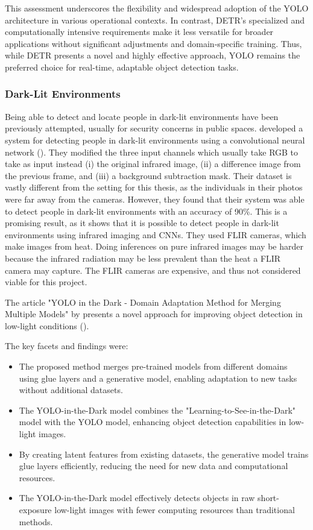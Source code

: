 This assessment underscores the flexibility and widespread adoption of the YOLO architecture in various operational contexts. In contrast, DETR's specialized and computationally intensive requirements make it less versatile for broader applications without significant adjustments and domain-specific training. Thus, while DETR presents a novel and highly effective approach, YOLO remains the preferred choice for real-time, adaptable object detection tasks.

\subsubsection{Dark-Lit Environments}
Being able to detect and locate people in dark-lit environments have been previously attempted, usually for security concerns in public spaces. \citeauthor{pa2020PersonDetectionNightTimeFLIR} developed a system for detecting people in dark-lit environments using a convolutional neural network (\citeyear{pa2020PersonDetectionNightTimeFLIR}). They modified the three input channels which usually take RGB to take as input instead (i) the original infrared image, (ii) a difference image from the previous frame, and (iii) a background subtraction mask. Their dataset is vastly different from the setting for this thesis, as the individuals in their photos were far away from the cameras. However, they found that their system was able to detect people in dark-lit environments with an accuracy of 90\%. This is a promising result, as it shows that it is possible to detect people in dark-lit environments using infrared imaging and CNNs. They used FLIR cameras, which make images from heat. Doing inferences on pure infrared images may be harder because the infrared radiation may be less prevalent than the heat a FLIR camera may capture. The FLIR cameras are expensive, and thus not considered viable for this project.

The article "YOLO in the Dark - Domain Adaptation Method for Merging Multiple Models" by \citeauthor{Sasagawa2020YOLO} presents a novel approach for improving object detection in low-light conditions (\citeyear{Sasagawa2020YOLO}). 

The key facets and findings were: 
\begin{itemize}
    \item The proposed method merges pre-trained models from different domains using glue layers and a generative model, enabling adaptation to new tasks without additional datasets. 
    \item The YOLO-in-the-Dark model combines the "Learning-to-See-in-the-Dark" model with the YOLO model, enhancing object detection capabilities in low-light images. 
    \item By creating latent features from existing datasets, the generative model trains glue layers efficiently, reducing the need for new data and computational resources. 
    \item The YOLO-in-the-Dark model effectively detects objects in raw short-exposure low-light images with fewer computing resources than traditional methods.
\end{itemize}

